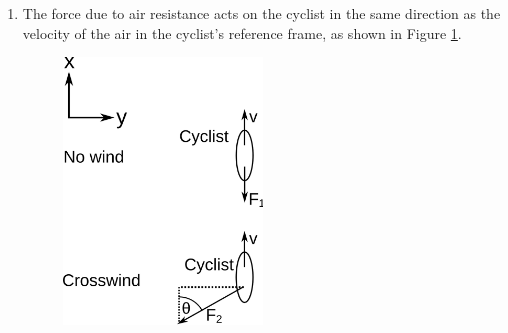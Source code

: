 \begin{problem}
{\begin{enumerate}


\item  The force due to air resistance acts on the cyclist in the same direction as the velocity of the air in the cyclist's reference frame, as shown in Figure \ref{fig:dynamics_bike_air_forces}.

\begin{figure}[h]
\centering
\includegraphics[width=0.5\textwidth]{../../../figures/dynamics_bike_air_forces.svg}
\caption{}\label{fig:dynamics_bike_air_forces}
\end{figure}


\end{enumerate}}
\end{problem}
